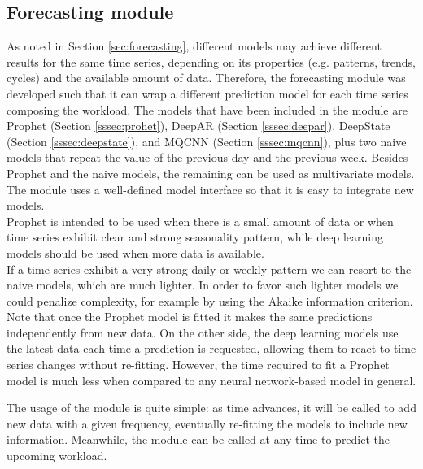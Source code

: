\documentclass[a4paper, 12pt]{article} %
\begin{document}
	\subsection{Forecasting module} \label{ssec:forecasting_module}
	As noted in Section \ref{sec:forecasting}, different models may achieve different results for the same time series, depending on its properties (e.g. patterns, trends, cycles) and the available amount of data. Therefore, the forecasting module was developed such that it can wrap a different prediction model for each time series composing the workload.
	The models that have been included in the module are Prophet (Section \ref{sssec:prohet}), DeepAR (Section \ref{sssec:deepar}), DeepState (Section \ref{sssec:deepstate}), and MQCNN (Section \ref{sssec:mqcnn}), plus two naive models that repeat the value of the previous day and the previous week. Besides Prophet and the naive models, the remaining can be used as multivariate models. The module uses a well-defined model interface so that it is easy to integrate new models.\\
	Prophet is intended to be used when there is a small amount of data or when time series exhibit clear and strong seasonality pattern, while deep learning models should be used when more data is available.\\
	If a time series exhibit a very strong daily or weekly pattern we can resort to the naive models, which are much lighter. In order to favor such lighter models we could penalize complexity, for example by using the Akaike information criterion. \\
	Note that once the Prophet model is fitted it makes the same predictions independently from new data. On the other side, the deep learning models use the latest data each time a prediction is requested, allowing them to react to time series changes without re-fitting. However, the time required to fit a Prophet model is much less when compared to any neural network-based model in general.
	
	The usage of the module is quite simple: as time advances, it will be called to add new data with a given frequency, eventually re-fitting the models to include new information. Meanwhile, the module can be called at any time to predict the upcoming workload. 
	
\end{document}

